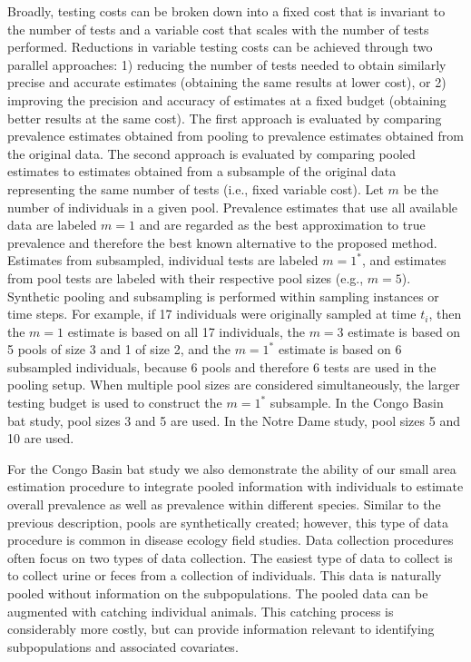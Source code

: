 \documentclass{article}
\begin{document}
Broadly, testing costs can be broken down into a fixed cost that is invariant to the number of tests and a variable cost that scales with the number of tests performed. Reductions in variable testing costs can be achieved through two parallel approaches: 1) reducing the number of tests needed to obtain similarly precise and accurate estimates (obtaining the same results at lower cost), or 2) improving the precision and accuracy of estimates at a fixed budget (obtaining better results at the same cost). The first approach is evaluated by comparing prevalence estimates obtained from pooling to prevalence estimates obtained from the original data. The second approach is evaluated by comparing pooled estimates to estimates obtained from a subsample of the original data representing the same number of tests (i.e., fixed variable cost). Let $m$ be the number of individuals in a given pool. Prevalence estimates that use all available data are labeled $m=1$ and are regarded as the best approximation to true prevalence and therefore the best known alternative to the proposed method. Estimates from subsampled, individual tests are labeled $m=1^*$, and estimates from pool tests are labeled with their respective pool sizes (e.g., $m=5$). Synthetic pooling and subsampling is performed within sampling instances or time steps. For example, if 17 individuals were originally sampled at time $t_i$, then the $m=1$ estimate is based on all 17 individuals, the $m=3$ estimate is based on 5 pools of size 3 and 1 of size 2, and the $m=1^*$ estimate is based on 6 subsampled individuals, because 6 pools and therefore 6 tests are used in the pooling setup. When multiple pool sizes are considered simultaneously, the larger testing budget is used to construct the $m=1^*$ subsample. In the Congo Basin bat study, pool sizes 3 and 5 are used. In the Notre Dame study, pool sizes 5 and 10 are used. 

For the Congo Basin bat study we also demonstrate the ability of our small area estimation procedure to integrate pooled information with individuals to estimate overall prevalence as well as prevalence within different species. Similar to the previous description, pools are synthetically created; however, this type of data procedure is common in disease ecology field studies. Data collection procedures often focus on two types of data collection. The easiest type of data to collect is to collect urine or feces from a collection of individuals. This data is naturally pooled without information on the subpopulations. The pooled data can be augmented with catching individual animals. This catching process is considerably more costly, but can provide information relevant to identifying subpopulations and associated covariates.
\end{document}
